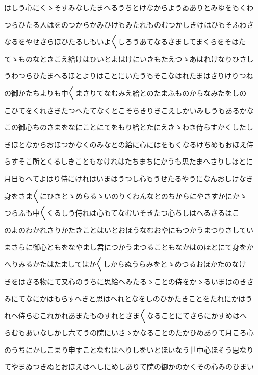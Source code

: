 \documentclass[a4paper,11pt,landscape]{ltjtarticle}
\begin{document}
はしう心にくゝそすみなしたまへるうちとけなからようゐありとみゆをもくわ
\par\medskip
つらひたる人はをのつからかみひけもみたれものむつかしきけはひもそふわさ
\par\medskip
なるをやせさらほひたるしもいよ〱しろうあてなるさましてまくらをそはた
\par\medskip
てゝものなときこえ給けはひいとよはけにいきもたえつゝあはれけなりひさし
\par\medskip
うわつらひたまへるほとよりはことにいたうもそこなはれたまはさりけりつね
\par\medskip
の御かたちよりも中〱まさりてなむみえ給とのたまふものからなみたをしの
\par\medskip
こひてをくれさきたつへたてなくとこそちきりきこえしかいみしうもあるかな
\par\medskip
この御心ちのさまをなにことにてをもり給とたにえきゝわき侍らすかくしたし
\par\medskip
きほとなからおほつかなくのみなとの給に心にはをもくなるけちめもおほえ侍
\par\medskip
らすそこ所とくるしきこともなけれはたちまちにかうも思たまへさりしほとに
\par\medskip
月日もへてよはり侍にけれはいまはうつし心もうせたるやうになんおしけなき
\par\medskip
身をさま〱にひきとゝめらるゝいのりくわんなとのちからにやさすかにかゝ
\par\medskip
つらふも中〱くるしう侍れは心もてなむいそきたつ心ちしはへるさるはこ
\par\medskip
のよのわかれさりかたきことはいとおほうなむおやにもつかうまつりさしてい
\par\medskip
まさらに御心ともをなやまし君につかうまつることもなかはのほとにて身をか
\par\medskip
へりみるかたはたましてはか〱しからぬうらみをとゝめつるおほかたのなけ
\par\medskip
きをはさる物にて又心のうちに思給へみたるゝことの侍をかゝるいまはのきさ
\par\medskip
みにてなにかはもらすへきと思はへれとなをしのひかたきことをたれにかはう
\par\medskip
れへ侍らむこれかれあまたものすれとさま〱なることにてさらにかすめはへ
\par\medskip
らむもあいなしかし六てうの院にいさゝかなることのたかひめありて月ころ心
\par\medskip
のうちにかしこまり申すことなむはへりしをいとほいなう世中心ほそう思なり
\par\medskip
てやまゐつきぬとおほえはへしにめしありて院の御かのかくその心みのひまい
\end{document}
